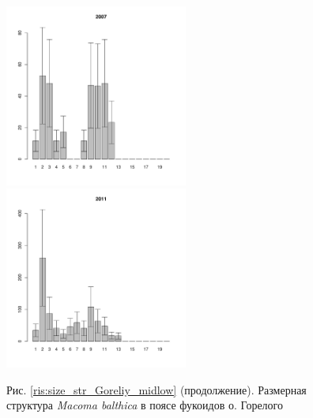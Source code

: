 \documentclass[12pt, a4paper]{article}
\begin{document}
\begin{figure}[h]

\begin{multicols}{3}
\hfill
\includegraphics[width=60mm]{../White_Sea/Luvenga_Goreliy/midlow_2007_.pdf}
\hfill
\includegraphics[width=60mm]{../White_Sea/Luvenga_Goreliy/midlow_2011_.pdf}
\end{multicols}


\begin{center}
Рис. \ref{ris:size_str_Goreliy_midlow} (продолжение). Размерная структура {\it Macoma balthica} в поясе фукоидов о. Горелого

\end{center}
\end{figure}
\end{document}

